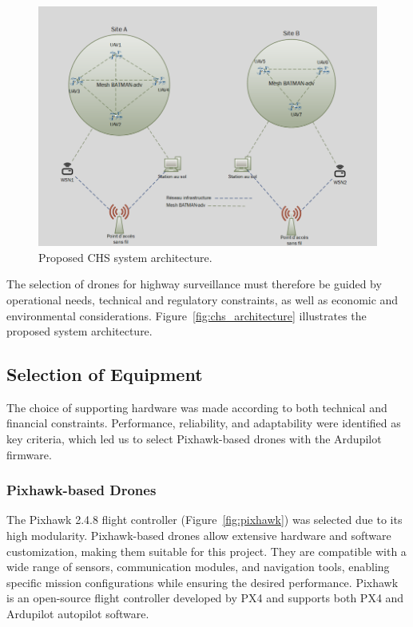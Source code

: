 \begin{figure}[H]  
    \centering
    \includegraphics[width=1.0\textwidth]{Figures/Chapter5/Section2/archi.png} %
    \caption{Proposed CHS system architecture.}
    \label{fig:proposed_architecture} %
\end{figure}


The selection of drones for highway surveillance must therefore be guided by operational needs, 
technical and regulatory constraints, as well as economic and environmental considerations.  
Figure~\ref{fig:chs_architecture} illustrates the proposed system architecture.

\subsection*{Selection of Equipment}

The choice of supporting hardware was made according to both technical and financial constraints. 
Performance, reliability, and adaptability were identified as key criteria, which led us to select 
Pixhawk-based drones with the Ardupilot firmware.

\subsubsection*{Pixhawk-based Drones}

The Pixhawk 2.4.8 flight controller (Figure~\ref{fig:pixhawk}) was selected due to its high modularity.  
Pixhawk-based drones allow extensive hardware and software customization, making them suitable 
for this project. They are compatible with a wide range of sensors, communication modules, and 
navigation tools, enabling specific mission configurations while ensuring the desired performance.  
Pixhawk is an open-source flight controller developed by PX4 and supports both PX4 and Ardupilot 
autopilot software.

